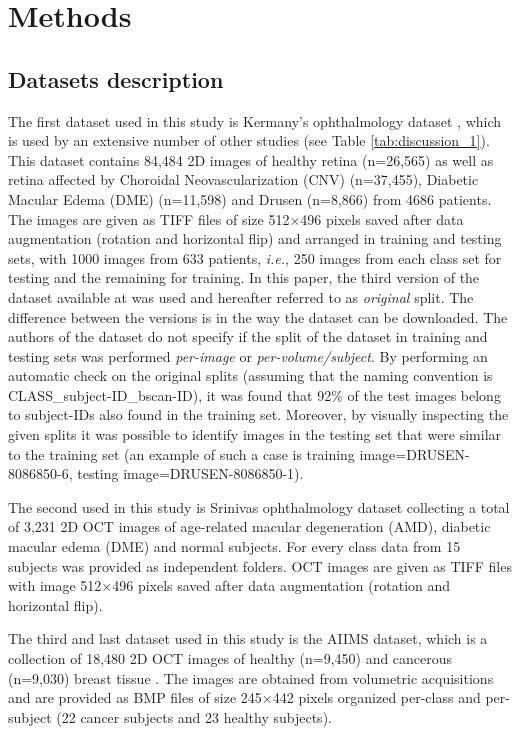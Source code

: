 \documentclass[fleqn,10pt]{wlscirep}
\begin{document}
\section*{Methods}
\subsection*{Datasets description}
The first dataset used in this study is Kermany's ophthalmology dataset \cite{kermany2018large, kermany2018identifying}, which is used by an extensive number of other studies (see Table \ref{tab:discussion_1}). This dataset contains 84,484 2D images of healthy retina (n=26,565) as well as retina affected by Choroidal Neovascularization (CNV) (n=37,455), Diabetic Macular Edema (DME) (n=11,598) and Drusen (n=8,866) from 4686 patients. The images are given as TIFF files of size 512$\times$496 pixels saved after data augmentation (rotation and horizontal flip) and arranged in training and testing sets, with 1000 images from 633 patients, \textit{i.e.}, 250 images from each class set for testing and the remaining for training. In this paper, the third version of the dataset available at \cite{kermany2018large} was used and hereafter referred to as \textit{original} split. The difference between the versions is in the way the dataset can be downloaded. The authors of the dataset \cite{kermany2018large} do not specify if the split of the dataset in training and testing sets was performed \textit{per-image} or \textit{per-volume/subject}. By performing an automatic check on the original splits (assuming that the naming convention is CLASS\_subject-ID\_bscan-ID), it was found that 92\% of the test images belong to subject-IDs also found in the training set. Moreover, by visually inspecting the given splits it was possible to identify images in the testing set that were similar to the training set (an example of such a case is training image=DRUSEN-8086850-6, testing image=DRUSEN-8086850-1).

The second used in this study is Srinivas ophthalmology dataset \cite{srinivasan2014fully} collecting a total of 3,231 2D OCT images of age-related macular degeneration (AMD),  diabetic macular edema (DME) and normal subjects.  For every class data from 15 subjects was provided as independent folders. OCT images are given as TIFF files with image 512$\times$496 pixels saved after data augmentation (rotation and horizontal flip).

The third and last dataset used in this study is the AIIMS dataset, which is a collection of 18,480 2D OCT images of healthy (n=9,450) and cancerous (n=9,030) breast tissue \cite{butola2019volumetric}. The images are obtained from volumetric acquisitions and are provided as BMP files of size 245$\times$442 pixels organized per-class and per-subject (22 cancer subjects and 23 healthy subjects). 
\end{document}
